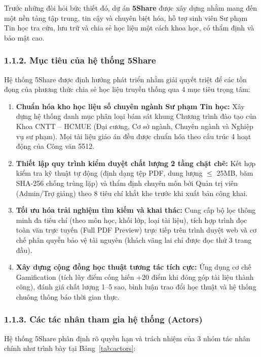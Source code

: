 Trước những đòi hỏi bức thiết đó, dự án \textbf{5Share} được xây dựng nhằm mang đến một nền tảng tập trung, tin cậy và chuyên biệt hóa, hỗ trợ sinh viên Sư phạm Tin học tra cứu, lưu trữ và chia sẻ học liệu một cách khoa học, có thẩm định và bảo mật cao.

\subsubsection{1.1.2. Mục tiêu của hệ thống 5Share}
Hệ thống 5Share được định hướng phát triển nhằm giải quyết triệt để các tồn đọng của phương thức chia sẻ học liệu truyền thống qua 4 mục tiêu trọng tâm:
\begin{enumerate}
    \item \textbf{Chuẩn hóa kho học liệu số chuyên ngành Sư phạm Tin học:} Xây dựng hệ thống danh mục phân loại bám sát khung Chương trình đào tạo của Khoa CNTT -- HCMUE (Đại cương, Cơ sở ngành, Chuyên ngành và Nghiệp vụ sư phạm). Mọi tài liệu giáo án đều được chuẩn hóa theo cấu trúc 4 hoạt động của Công văn 5512.
    \item \textbf{Thiết lập quy trình kiểm duyệt chất lượng 2 tầng chặt chẽ:} Kết hợp kiểm tra kỹ thuật tự động (định dạng tệp PDF, dung lượng $\le$ 25MB, băm SHA-256 chống trùng lặp) và thẩm định chuyên môn bởi Quản trị viên (Admin/Trợ giảng) theo 8 tiêu chí khắt khe trước khi xuất bản công khai.
    \item \textbf{Tối ưu hóa trải nghiệm tìm kiếm và khai thác:} Cung cấp bộ lọc thông minh đa tiêu chí (theo môn học, khối lớp, loại tài liệu), tích hợp trình đọc toàn văn trực tuyến (Full PDF Preview) trực tiếp trên trình duyệt web và cơ chế phân quyền bảo vệ tài nguyên (khách vãng lai chỉ được đọc thử 3 trang đầu).
    \item \textbf{Xây dựng cộng đồng học thuật tương tác tích cực:} Ứng dụng cơ chế Gamification (tích lũy điểm cống hiến +20 điểm khi đóng góp tài liệu thành công), đánh giá chất lượng 1--5 sao, bình luận trao đổi học thuật và hệ thống chuông thông báo thời gian thực.
\end{enumerate}

\subsubsection{1.1.3. Các tác nhân tham gia hệ thống (Actors)}
Hệ thống 5Share phân định rõ quyền hạn và trách nhiệm của 3 nhóm tác nhân chính như trình bày tại Bảng~\ref{tab:actors}:


